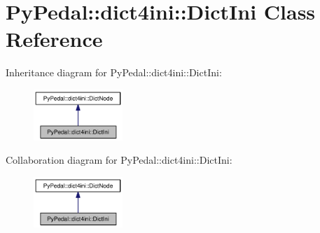 \hypertarget{classPyPedal_1_1dict4ini_1_1DictIni}{
\section{PyPedal::dict4ini::DictIni Class Reference}
\label{classPyPedal_1_1dict4ini_1_1DictIni}
}
Inheritance diagram for PyPedal::dict4ini::DictIni:\nopagebreak
\begin{figure}[H]
\begin{center}
\leavevmode
\includegraphics[width=95pt]{classPyPedal_1_1dict4ini_1_1DictIni__inherit__graph}
\end{center}
\end{figure}
Collaboration diagram for PyPedal::dict4ini::DictIni:\nopagebreak
\begin{figure}[H]
\begin{center}
\leavevmode
\includegraphics[width=95pt]{classPyPedal_1_1dict4ini_1_1DictIni__coll__graph}
\end{center}
\end{figure}

